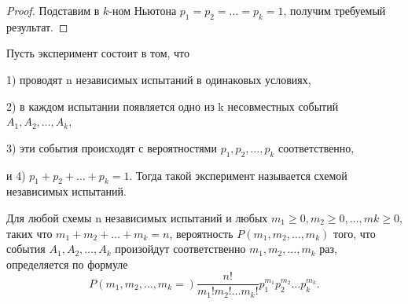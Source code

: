 \begin{proof}
	Подставим в $k$-ном Ньютона $p_1 = p_2 = \dots = p_k = 1$,
получим требуемый результат.
\end{proof}

\begin{definition}
	Пусть эксперимент состоит в том, что

1) проводят n независимых испытаний в одинаковых условиях,

2) в каждом испытании появляется одно из k несовместных событий
 \centering
{$A_1, A_2,\dots, A_k$},

3) эти события происходят с вероятностями $p_1, p_2,\dots, p_k$ соответственно,

и 4) $p_1 + p_2 + \dots+ p_k = 1$.
Тогда такой эксперимент называется схемой независимых испытаний.
\end{definition}

\begin{theorem}
	Для любой схемы n независимых испытаний и любых \newline
$m_1 \geqslant 0, m_2 \geqslant 0,\dots  , mk \geqslant 0$, таких что $m_1 + m_2 +\dots  + m_k = n$, вероятность $P(m_1,m_2,\dots  ,m_k)$ того, что события $A_1, A_2,\dots  , A_k$ произойдут
соответственно $m_1,m_2,\dots  ,m_k$ раз, определяется по формуле
	\begin{equation*}
		P(m_1,m_2,\dots,m_k=)\frac{n!}{m_1!m_2!\dots m_k!}p_1^{m_1}p_2^{m_2}\dots p_k^{m_k}.
	\end{equation*}
\end{theorem}